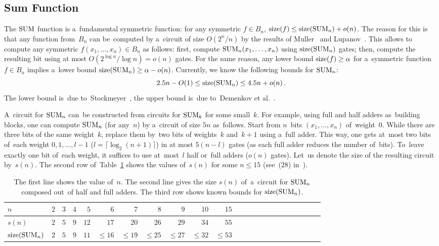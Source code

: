 \subsection{Sum Function}
The $\operatorname{SUM}$ function is a~fundamental symmetric function: for any symmetric $f \in B_n$, $\operatorname{size}(f)\le \operatorname{size}(\operatorname{SUM}_n)+o(n)$. The reason for this is that any function from~$B_n$ can be~computed by a~circuit of size $O(2^n/n)$ by the results of Muller~\cite{M56} and Lupanov~\cite{Lup59}. This allows to compute any symmetric $f(x_1, \dotsc, x_n) \in B_n$ as follows: first, compute $\operatorname{SUM}_n(x_1, \dotsc, x_n)$ using $\operatorname{size}(\operatorname{SUM}_n)$ gates; then, compute the resulting bit using at most $O(2^{\log n}/\log n)=o(n)$ gates. For the same reason, any lower bound $\operatorname{size}(f) \ge \alpha$ for
a~symmetric function~$f \in B_n$ implies a~lower bound $\operatorname{size}(\operatorname{SUM}_n) \ge \alpha-o(n)$. Currently, we know the following bounds for $\operatorname{SUM}_n$:
\[2.5n-O(1) \le \operatorname{size}(\operatorname{SUM}_n) \le 4.5n+o(n) \, .\]
The lower bound is~due to~Stockmeyer~\cite{DBLP:journals/mst/Stockmeyer77}, the upper bound is~due to~Demenkov et al.~\cite{DBLP:journals/ipl/DemenkovKKY10}.

A~circuit for $\operatorname{SUM}_n$ can~be constructed from circuits for $\operatorname{SUM}_k$ for some small~$k$. For example,
using full and half adders as~building blocks, one can compute $\operatorname{SUM}_n$ (for any~$n$) by a~circuit of size $5n$ as~follows. Start from $n$~bits $(x_1, \dotsc, x_n)$ of~weight~$0$. While there are three bits of the same weight~$k$, replace them by~two bits of weights~$k$ and~$k+1$ using a~full adder. This way, one gets at~most two bits of~each weight $0,1,\dotsc,l-1$ ($l=\lceil \log_2(n+1)\rceil$) in at most $5(n-l)$ gates (as each full adder reduces the number of~bits). To~leave exactly one bit
of~each weight, it suffices to use at~most~$l$ half
or~full adders ($o(n)$ gates). Let~us denote the
size of the resulting circuit by~$s(n)$. The second row
of~Table~\ref{table:sum} shows the values of~$s(n)$ for
some $n \le 15$ (see~(28) in~\cite{Knuth:2008:ACP:1377542}).

\begin{table}
\begin{center}
\begin{tabular}{lrrrrrrrrrrrrrrrrrrrrrr}
\toprule
$n$ & $2$ & $3$ & $4$ & $5$ & $6$ & $7$ & $8$ & $9$ & $10$ & $15$
\\
\midrule
$s(n)$ &$2$ & $5$ & $9$ & $12$ & $17$ & $20$ & $26$ & $29$& $34$&
$55$
\\
$\operatorname{size}(\operatorname{SUM}_n)$ & $2$ & $5$ & $9$ & $11$
& $\le 16$ & $\le 19$ & $\le 25$ & $\le 27$
& $\le 32$ & $\le 53$
\\
\bottomrule
\end{tabular}
\end{center}
\caption{The first line shows the value of~$n$. The second line gives the size $s(n)$ of~a~circuit for $\operatorname{SUM}_n$
composed out~of half and full adders. The third row shows known bounds for $\operatorname{size}(\operatorname{SUM}_n)$.}
\label{table:sum}
\end{table}

